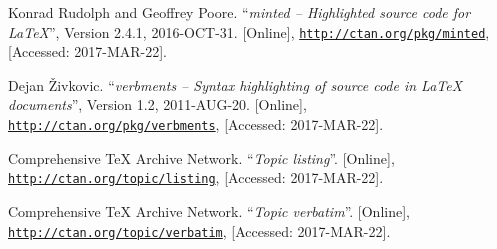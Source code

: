 \documentclass[article,a4paper,oneside,10pt]{memoir}
\begin{document}
\begin{thebibliography}{1}
        Konrad Rudolph and Geoffrey Poore.
        ``\emph{minted -- Highlighted source code for \LaTeX}'',
        Version 2.4.1,
        2016-OCT-31.
        [Online],
        \href{http://ctan.org/pkg/minted}{\nolinkurl{http://ctan.org/pkg/minted}},
        [Accessed: 2017-MAR-22].

        Dejan Živkovic.
        ``\emph{verbments -- Syntax highlighting of source code in \LaTeX{} documents}'',
        Version 1.2,
        2011-AUG-20.
        [Online],
        \href{http://ctan.org/pkg/verbments}{\nolinkurl{http://ctan.org/pkg/verbments}},
        [Accessed: 2017-MAR-22].

        Comprehensive \TeX{} Archive Network.
        ``\emph{Topic listing}''.
        [Online],
        \href{http://ctan.org/topic/listing}{\nolinkurl{http://ctan.org/topic/listing}},
        [Accessed: 2017-MAR-22].

        Comprehensive \TeX{} Archive Network.
        ``\emph{Topic verbatim}''.
        [Online],
        \href{http://ctan.org/topic/verbatim}{\nolinkurl{http://ctan.org/topic/verbatim}},
        [Accessed: 2017-MAR-22].


\end{thebibliography}
\end{document}
